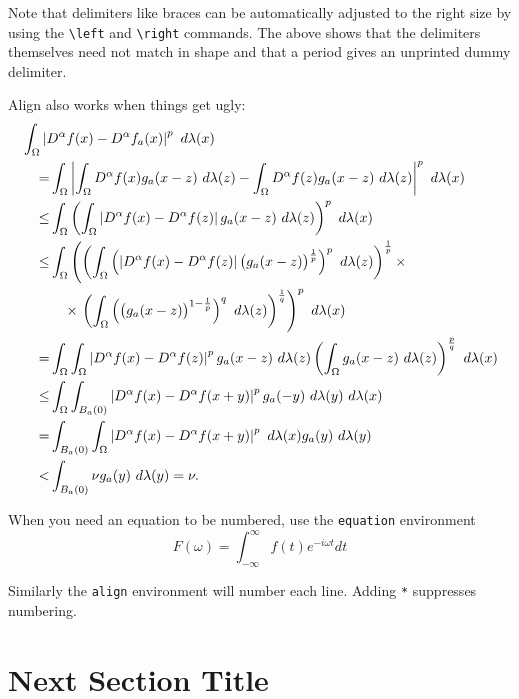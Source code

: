 Note that delimiters like braces can be automatically adjusted to the right size
by using the \verb+\left+ and \verb+\right+ commands.
The above shows that the delimiters themselves need not match in shape and
that a period gives an unprinted dummy delimiter.

Align also works when things get ugly:
\begin{align*}
\MoveEqLeft
\int _{\Omega
} \left|
D^\alpha f(x)
-D^\alpha f_a (x)\right| ^p
\ d\lambda (x)
\\
= &
\int _{\Omega
}
\left| \int _\Omega D^\alpha f(x) g_a (x-z) \ d\lambda (z)-
\int _\Omega D^\alpha f (z) g_a (x-z)  \ d\lambda (z)
\right| ^p
\ d\lambda (x)
\\
\leq &
\int _\Omega \left(
\int _\Omega \left| D^\alpha f(x)-D^\alpha f (z) \right|
g_a (x-z)  \ d\lambda (z)
\right) ^p
\ d\lambda (x)
\\
\leq &
\int _\Omega \left(
\left(
\int _\Omega \left( \left| D^\alpha f(x)-D^\alpha f (z) \right|
\big( g_a (x-z)\big) ^{1\over p}  \right) ^p \ d\lambda (z)
\right) ^{1\over p}
\times \right.
\\
&
\quad
\times
\left.
\left(
\int _\Omega
\left(
\big( g_a (x-z)\big) ^{1-{1\over p}}  \right) ^q \ d\lambda (z)
\right) ^{1\over q}
\right) ^p
\ d\lambda (x)
\\
= &
\int _\Omega
\int _\Omega \left| D^\alpha f(x)-D^\alpha f (z) \right| ^p
g_a (x-z) \ d\lambda (z)
\left(
\int _\Omega
g_a (x-z)   \ d\lambda (z)
\right) ^{p\over q}
\ d\lambda (x)
\\
\leq &
\int _\Omega
\int _{B_a (0)} \left| D^\alpha f(x)-D^\alpha f (x+y) \right| ^p
g_a (-y) \ d\lambda (y)
\ d\lambda (x)
\\
= &
\int _{B_a (0)}
\int _\Omega
\left| D^\alpha f(x)-D^\alpha f (x+y) \right| ^p
\ d\lambda (x)
g_a (y) \ d\lambda (y)
\\
< &
\int _{B_a (0)}
\nu
g_a (y) \ d\lambda (y)
=\nu .
\end{align*}

\newpage

When you need an equation to be numbered, use the \verb+equation+ environment
\begin{equation}\label{fourier}
	F(\omega) = \int_{-\infty}^\infty f(t) e^{-i\omega t}dt
\end{equation}

Similarly the \verb+align+ environment will number each line. Adding \verb+*+
suppresses numbering.



\section{Next Section Title}

